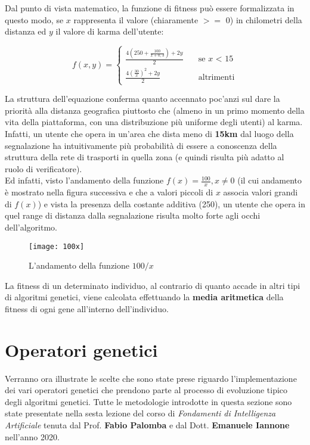     Dal punto di vista matematico, la funzione di fitness può essere formalizzata in questo modo, se $x$ rappresenta il valore (chiaramente $>=$ 0) in chilometri della distanza ed $y$ il valore di karma dell'utente:

    \[ f(x, y) =
  \begin{cases}
    \frac{4(250 + \frac{100}{x+0,3}) + 2y}{2}      & \quad \text{se } x \text{ < 15}\\
    \frac{4(\frac{30}{x})^2 + 2y}{2}  & \quad \text{altrimenti}
  \end{cases}
\]

\newpage
La struttura dell'equazione conferma quanto accennato poc'anzi sul dare la priorità alla distanza geografica piuttosto che (almeno in un primo momento della vita della piattaforma, con una distribuzione più uniforme degli utenti) al karma. Infatti, un utente che opera in un'area che dista meno di \textbf{15km} dal luogo della segnalazione ha intuitivamente più probabilità di essere a conoscenza della struttura della rete di trasporti in quella zona (e quindi risulta più adatto al ruolo di verificatore). \\
Ed infatti, visto l'andamento della funzione $f(x) = \frac{100}{x}, x \neq 0$ (il cui andamento è mostrato nella figura successiva e che a valori piccoli di $x$ associa valori grandi di $f(x)$) e vista la presenza della costante additiva (250), un utente che opera in quel range di distanza dalla segnalazione risulta molto forte agli occhi dell'algoritmo.
\begin{figure}[h!]
    \begin{center}
        \texttt{[image: 100x]}
    \end{center}
    \caption{L'andamento della funzione $100/x$}
    \label{fig: L'andamento della funzione $100/x$}
\end{figure}

La fitness di un determinato individuo, al contrario di quanto accade in altri tipi di algoritmi genetici, viene calcolata effettuando la \textbf{media aritmetica} della fitness di ogni gene all'interno dell'individuo. 
\newpage
\section{Operatori genetici}
  Verranno ora illustrate le scelte che sono state prese riguardo l'implementazione dei vari operatori genetici che prendono parte al processo di evoluzione tipico degli algoritmi genetici. Tutte le metodologie introdotte in questa sezione sono state presentate nella sesta lezione del corso di \textit{Fondamenti di Intelligenza Artificiale} tenuta dal Prof. \textbf{Fabio Palomba} e dal Dott. \textbf{Emanuele Iannone} nell'anno 2020.

